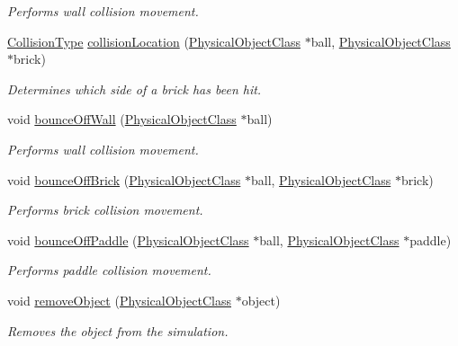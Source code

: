 \begin{DoxyCompactItemize}
\begin{DoxyCompactList}\small\item\em Performs wall collision movement. \end{DoxyCompactList}\item 
\hyperlink{EnvironmentClass_8h_aa884075f403706dceea29a61771a0d44}{Collision\-Type} \hyperlink{classEnvironmentClass_a75226d04d26221aa24cef7a00bce6ce2}{collision\-Location} (\hyperlink{classPhysicalObjectClass}{Physical\-Object\-Class} $\ast$ball, \hyperlink{classPhysicalObjectClass}{Physical\-Object\-Class} $\ast$brick)
\begin{DoxyCompactList}\small\item\em Determines which side of a brick has been hit. \end{DoxyCompactList}\item 
void \hyperlink{classEnvironmentClass_a1ed98b3b6278f232cf12f660b8adbc42}{bounce\-Off\-Wall} (\hyperlink{classPhysicalObjectClass}{Physical\-Object\-Class} $\ast$ball)
\begin{DoxyCompactList}\small\item\em Performs wall collision movement. \end{DoxyCompactList}\item 
void \hyperlink{classEnvironmentClass_a897de11455490caa445294c40db3347d}{bounce\-Off\-Brick} (\hyperlink{classPhysicalObjectClass}{Physical\-Object\-Class} $\ast$ball, \hyperlink{classPhysicalObjectClass}{Physical\-Object\-Class} $\ast$brick)
\begin{DoxyCompactList}\small\item\em Performs brick collision movement. \end{DoxyCompactList}\item 
void \hyperlink{classEnvironmentClass_a36b4ce6ee76f327dc2b5155228ccf177}{bounce\-Off\-Paddle} (\hyperlink{classPhysicalObjectClass}{Physical\-Object\-Class} $\ast$ball, \hyperlink{classPhysicalObjectClass}{Physical\-Object\-Class} $\ast$paddle)
\begin{DoxyCompactList}\small\item\em Performs paddle collision movement. \end{DoxyCompactList}\item 
void \hyperlink{classEnvironmentClass_a564160db6ba48653b24b3a42ce9d2d58}{remove\-Object} (\hyperlink{classPhysicalObjectClass}{Physical\-Object\-Class} $\ast$object)
\begin{DoxyCompactList}\small\item\em Removes the object from the simulation. \end{DoxyCompactList}\end{DoxyCompactItemize}
